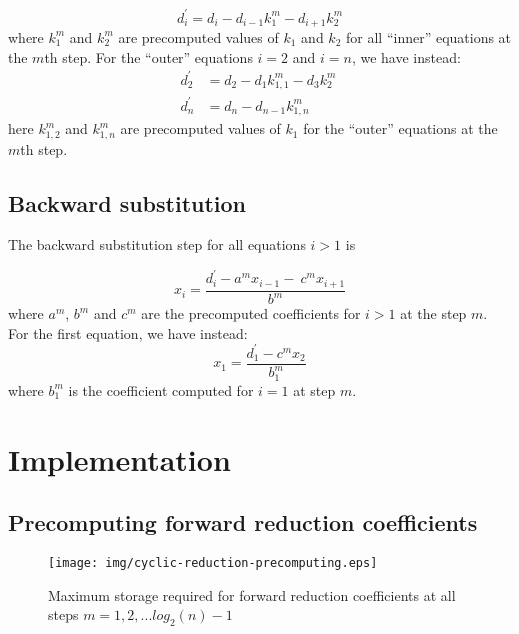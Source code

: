 \begin{equation}
d^{\prime}_i = d_i - d_{i-1}k_1^{m}  - d_{i+1}k_2^{m}
\label{eqn:precomputed-forward-reduction-step}
\end{equation}
%
where $k_1^m$ and $k_2^m$ are
precomputed values of $k_1$ and $k_2$
for all ``inner'' equations at the $m$th step.
For the ``outer'' equations $i=2$ and $i=n$,
we have instead:
%
\begin{align}
    d^{\prime}_2 &= d_2 - d_{1}k_{1,1}^{m}  - d_{3}k_2^{m} \
    \label{eqn:precomputed-forward-reduction-step-2} \\
    d^{\prime}_n &= d_n - d_{n-1}k_{1,n}^{m} \
    \label{eqn:precomputed-forward-reduction-step-n} 
\end{align}
%
here $k_{1,2}^m$ and $k_{1,n}^m$ are
precomputed values of $k_1$
for the ``outer'' equations at the $m$th step.

\subsection{Backward substitution}

The backward substitution step for all equations $i > 1$ is

\begin{equation}
x_i = \frac{d^{\prime}_i - a^mx_{i-1} - \
    c^{m}x_{i+1}}{b^m}
\label{eqn:precomputed-backward-substitution-step}
\end{equation}
%
where $a^m$, $b^m$ and $c^m$ are the precomputed
coefficients for $i>1$ at the step $m$.
For the first equation, we have instead:
%
\begin{equation}
x_1 = \frac{d^{\prime}_1 - c^{m}x_{2}}{b_1^m}
\label{eqn:precomputed-backward-substitution-step-1}
\end{equation}
%
where $b_1^m$ is the
coefficient computed for $i = 1$ at step $m$.

\section{Implementation}

\subsection{Precomputing forward reduction coefficients}

\begin{figure}
\begin{center}
\texttt{[image: img/cyclic-reduction-precomputing.eps]}
\end{center}
\caption{Maximum storage required for forward reduction coefficients
at all steps $m=1, 2, ... log_2(n)-1$}
\label{fig:cyclic-reduction-precomputing}
\end{figure}


